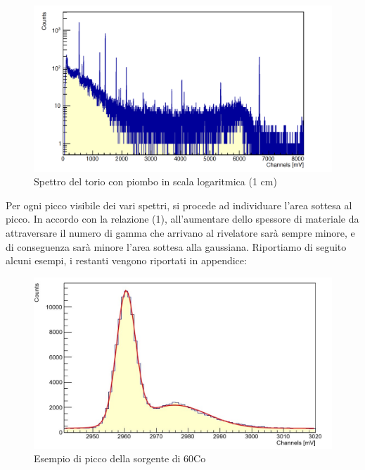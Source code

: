 \documentclass[a4paper,10pt]{article}
\begin{document}
\newpage

\begin{figure}[!h]
    \centering
    \includegraphics[scale=0.4]{img/toriopiombo}
    \caption{Spettro del torio con piombo in scala logaritmica (1 cm)}
\end{figure}

\noindent Per ogni picco visibile dei vari spettri, si procede ad individuare l'area sottesa al picco.  In accordo con la relazione (1), all'aumentare dello spessore di materiale da attraversare il numero di gamma che arrivano al rivelatore sar\`a sempre minore, e di conseguenza sar\`a minore l'area sottesa alla gaussiana. Riportiamo di seguito alcuni esempi, i restanti vengono riportati in appendice:

\begin{figure}[!h]
    \centering
    \includegraphics[scale=0.6]{grafici/piccocobalto}
    \caption{Esempio di picco della sorgente di 60Co}
\end{figure}
\end{document}
